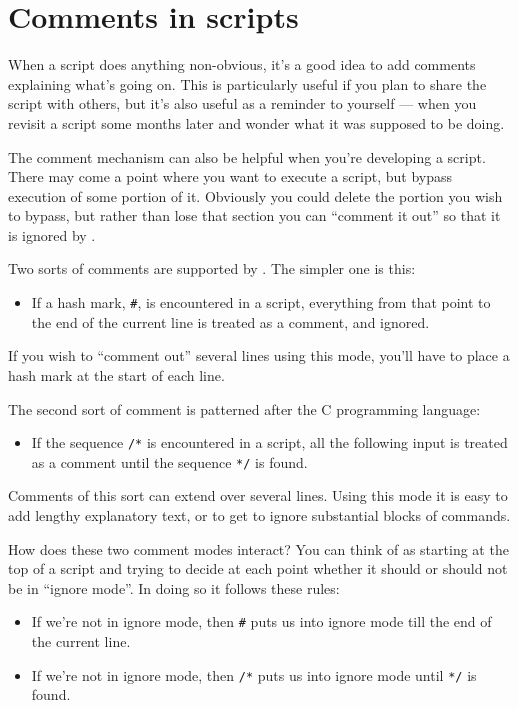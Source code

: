 \chapter{Comments in scripts}
\label{chap:comments}

When a script does anything non-obvious, it's a good idea to add
comments explaining what's going on.  This is particularly useful if
you plan to share the script with others, but it's also useful as a
reminder to yourself --- when you revisit a script some months later
and wonder what it was supposed to be doing.

The comment mechanism can also be helpful when you're developing a
script.  There may come a point where you want to execute a script,
but bypass execution of some portion of it.  Obviously you could
delete the portion you wish to bypass, but rather than lose that
section you can ``comment it out'' so that it is ignored by
.

Two sorts of comments are supported by .  The simpler one
is this:

\begin{itemize}
\item If a hash mark, \texttt{\#}, is encountered in a  script, 
  everything from that point to the end of the current line is treated as a 
  comment, and ignored.
\end{itemize}

If you wish to ``comment out'' several lines using this mode, you'll
have to place a hash mark at the start of each line.

The second sort of comment is patterned after the C programming language:

\begin{itemize}
\item If the sequence \texttt{/*} is encountered in a script, all the
  following input is treated as a comment until the sequence \texttt{*/}
  is found.
\end{itemize}

Comments of this sort can extend over several lines.  Using this mode
it is easy to add lengthy explanatory text, or to get  to
ignore substantial blocks of commands.

How does these two comment modes interact?  You can think of
 as starting at the top of a script and trying to decide at
each point whether it should or should not be in ``ignore mode''.  In
doing so it follows these rules:

\begin{itemize}
\item If we're not in ignore mode, then \texttt{\#} puts us into ignore
  mode till the end of the current line.
\item If we're not in ignore mode, then \texttt{/*} puts us into ignore
  mode until \texttt{*/} is found.
\end{itemize}

